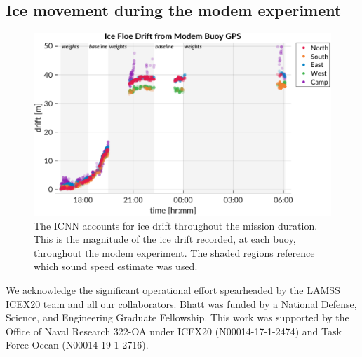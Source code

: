 \subsection*{Ice movement during the modem experiment}
\begin{figure}[h!]
\includegraphics[width=\textwidth]{figs/Fig9.pdf}
\caption{\label{fig:iceFloeDrift}{The ICNN accounts for ice drift throughout the mission duration. This is the magnitude of the ice drift recorded, at each buoy, throughout the modem experiment. The shaded regions reference which sound speed estimate was used.}}
\end{figure}



\FloatBarrier
\clearpage
\begin{acknowledgments}
We acknowledge the significant operational effort spearheaded by the LAMSS ICEX20 team and all our collaborators.
Bhatt was funded by a National Defense, Science, and Engineering Graduate Fellowship.
This work was supported by the Office of Naval Research 322-OA under ICEX20 (N00014-17-1-2474) and Task Force Ocean (N00014-19-1-2716).

\end{acknowledgments}


